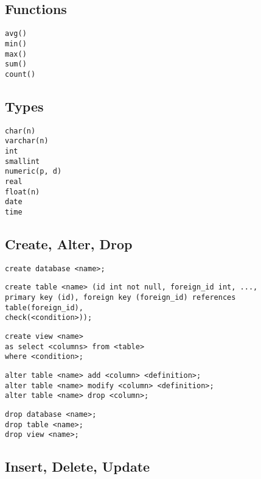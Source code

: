 \subsection{Functions}

\begin{lstlisting}[caption= built-in functions]
avg()
min()
max()
sum()
count()
\end{lstlisting}

\subsection{Types}

\begin{lstlisting}[caption=Types list]
char(n)
varchar(n)
int
smallint
numeric(p, d)
real
float(n)
date
time
\end{lstlisting}

\subsection{Create, Alter, Drop}

\begin{lstlisting}[caption=create database]
create database <name>;
\end{lstlisting}

\begin{lstlisting}[caption=create table]
create table <name> (id int not null, foreign_id int, ...,
primary key (id), foreign key (foreign_id) references table(foreign_id),
check(<condition>));
\end{lstlisting}

\begin{lstlisting}[caption=create view]
create view <name>
as select <columns> from <table>
where <condition>;
\end{lstlisting}

\begin{lstlisting}[caption=alter table]
alter table <name> add <column> <definition>;
alter table <name> modify <column> <definition>;
alter table <name> drop <column>;
\end{lstlisting}

\begin{lstlisting}[caption=drop]
drop database <name>;
drop table <name>;
drop view <name>;
\end{lstlisting}

\subsection{Insert, Delete, Update}

